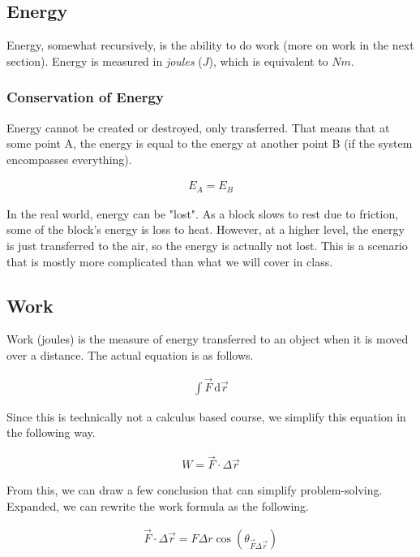 \documentclass{article}
\begin{document}
\subsection{Energy}
Energy, somewhat recursively, is the ability to do work (more on work
in the next section). Energy is measured in \textit{joules} ($J$), which is equivalent to
$Nm$.

\subsubsection{Conservation of Energy}
Energy cannot be created or destroyed, only transferred. That means
that at some point A, the energy is equal to the energy at another
point B (if the system encompasses everything).

\begin{eqnarray} \nonumber
    E_A = E_B
\end{eqnarray}

\noindent In the real world, energy can be "lost". As a block slows
to rest due to friction, some of the block's energy is loss to heat.
However, at a higher level, the energy is just transferred to the air,
so the energy is actually not lost. This is a scenario that is mostly
more complicated than what we will cover in class.


\subsection{Work}
Work (joules) is the measure of energy transferred to an object when it is 
moved over a distance. The actual equation is as follows.

\begin{eqnarray} \label{eq : true work}
    \int \vec{F} \, \text{d}\vec{r}
\end{eqnarray}

\noindent Since this is technically not a calculus based course, we simplify
this equation in the following way.

\begin{eqnarray} \label{eq : work}
    W = \vec{F} \cdot \Delta \vec{r}
\end{eqnarray}

\noindent From this, we can draw a few conclusion that can simplify 
problem-solving. Expanded, we can rewrite the work formula as the
following.

\begin{eqnarray} \nonumber
    \vec{F} \cdot \Delta \vec{r} = F \Delta r \cos(\theta_{\vec{F} \Delta \vec{r}})
\end{eqnarray}
\end{document}

